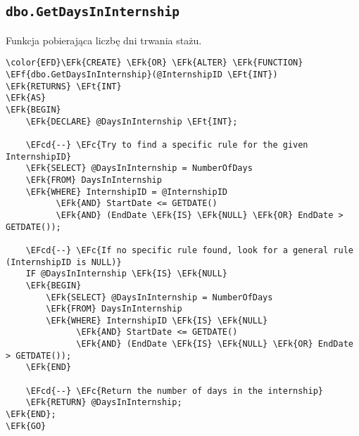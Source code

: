 \documentclass[11pt]{article}
\newcommand{\EFc}[1]{\textcolor{EFc}{\textit{#1}}} %
\newcommand{\EFcd}[1]{\textcolor{EFcd}{\textit{#1}}} %
\newcommand{\EFk}[1]{\textcolor{EFk}{\textbf{#1}}} %
\newcommand{\EFf}[1]{\textcolor{EFf}{#1}} %
\newcommand{\EFt}[1]{\textcolor{EFt}{\textbf{#1}}} %
\begin{document}
\subsection{\texttt{dbo.GetDaysInInternship}}
\label{sec:org389c211}
Funkcja pobierająca liczbę dni trwania stażu.
\begin{Code}
\begin{Verbatim}
\color{EFD}\EFk{CREATE} \EFk{OR} \EFk{ALTER} \EFk{FUNCTION} \EFf{dbo.GetDaysInInternship}(@InternshipID \EFt{INT})
\EFk{RETURNS} \EFt{INT}
\EFk{AS}
\EFk{BEGIN}
    \EFk{DECLARE} @DaysInInternship \EFt{INT};

    \EFcd{--} \EFc{Try to find a specific rule for the given InternshipID}
    \EFk{SELECT} @DaysInInternship = NumberOfDays
    \EFk{FROM} DaysInInternship
    \EFk{WHERE} InternshipID = @InternshipID
          \EFk{AND} StartDate <= GETDATE()
          \EFk{AND} (EndDate \EFk{IS} \EFk{NULL} \EFk{OR} EndDate > GETDATE());

    \EFcd{--} \EFc{If no specific rule found, look for a general rule (InternshipID is NULL)}
    IF @DaysInInternship \EFk{IS} \EFk{NULL}
    \EFk{BEGIN}
        \EFk{SELECT} @DaysInInternship = NumberOfDays
        \EFk{FROM} DaysInInternship
        \EFk{WHERE} InternshipID \EFk{IS} \EFk{NULL}
              \EFk{AND} StartDate <= GETDATE()
              \EFk{AND} (EndDate \EFk{IS} \EFk{NULL} \EFk{OR} EndDate > GETDATE());
    \EFk{END}

    \EFcd{--} \EFc{Return the number of days in the internship}
    \EFk{RETURN} @DaysInInternship;
\EFk{END};
\EFk{GO}
\end{Verbatim}
\end{Code}
\end{document}
